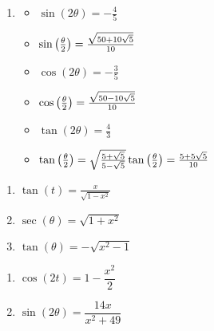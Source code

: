 \begin{enumerate}
\item \begin{multicols}{3}

\begin{itemize}

\item $\sin(2\theta) = -\frac{4}{5}$
\item $\sin\left(\frac{\theta}{2}\right) = \frac{\sqrt{50+10\sqrt{5}}}{10} \\ \phantom{\tan\left(\frac{\theta}{2}\right) =\frac{5-5\sqrt{5}}{10}}$ 

\item $\cos(2\theta) = -\frac{3}{5}$
\item $\cos\left(\frac{\theta}{2}\right)= \frac{\sqrt{50-10\sqrt{5}}}{10} \\ \phantom{\tan\left(\frac{\theta}{2}\right) =\frac{5-5\sqrt{5}}{10}}$ 
\item $\tan(2\theta)=\frac{4}{3}$
\item $\tan\left(\frac{\theta}{2}\right) =  \sqrt{\frac{5+\sqrt{5}}{5-\sqrt{5}}} \\ \tan\left(\frac{\theta}{2}\right) =\frac{5+5\sqrt{5}}{10}$

\end{itemize}

\end{multicols}

\setcounter{HW}{\value{enumi}}

\end{enumerate}

\begin{multicols}{3}
\begin{enumerate}
\setcounter{enumi}{\value{HW}}

\addtocounter{enumi}{19}

\item  $\tan(t) = \frac{x}{\sqrt{1 - x^2}}$

\item  $\sec(\theta) = \sqrt{1+x^2}$ 

\item  $\tan(\theta) = -\sqrt{x^2-1}$ 

\setcounter{HW}{\value{enumi}}
\end{enumerate}

\end{multicols}

\begin{multicols}{2}
\begin{enumerate}

\setcounter{enumi}{\value{HW}}

\item $\cos(2t) = 1 - \dfrac{x^{2}}{2}$

\item $\sin(2\theta) = \dfrac{14x}{x^{2} + 49}$

\setcounter{HW}{\value{enumi}}

\end{enumerate}

\end{multicols}

